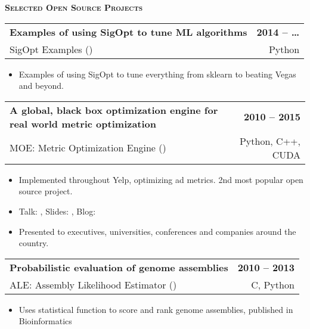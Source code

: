 \documentclass[letterpaper, 11pt]{article}
\makeatletter
\renewcommand{\section}[1]{%
  \begin{tcolorbox}
    \textsc{\textbf{\large{#1}}}
  \end{tcolorbox}
}
\newcommand{\entry}[4]{%
  \begin{tabularx}{\linewidth}{@{}Xr@{}}
    \textbf{#2} & \textbf{#1} \\
    #3          & #4          \\
  \end{tabularx}
}
\makeatother
\begin{document}
  \section{Selected Open Source Projects}
  
  \entry{2014 -- \ldots}{Examples of using SigOpt to tune ML algorithms}{SigOpt Examples (\website{github.com/sigopt/sigopt-examples})}{Python}
  \begin{itemize}
    \item{Examples of using SigOpt to tune everything from sklearn to beating Vegas and beyond.}
  \end{itemize}

  \entry{2010 -- 2015}{A global, black box optimization engine for real world metric optimization}{MOE: Metric Optimization Engine (\website{github.com/Yelp/MOE})}{Python, C++, CUDA}
  \begin{itemize}
    \item{Implemented throughout Yelp, optimizing ad metrics. 2nd most popular open source project.}
    \item{Talk: , Slides: , Blog: }
    \item{Presented to executives, universities, conferences and companies around the country.}
  \end{itemize}

  \entry{2010 -- 2013}{Probabilistic evaluation of genome assemblies}{ALE: Assembly Likelihood Estimator (\website{github.com/sc932/ALE})}{C, Python}
  \begin{itemize}
    \item{Uses statistical function to score and rank genome assemblies, published in Bioinformatics}
  \end{itemize}
\end{document}
